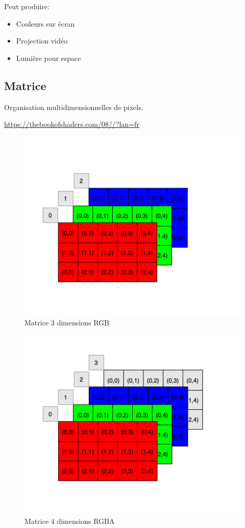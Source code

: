 \documentclass[
  french,
]{book}
\providecommand{\tightlist}{%
  \setlength{\itemsep}{0pt}\setlength{\parskip}{0pt}}
\begin{document}
Peut produire:

\begin{itemize}
\tightlist
\item
  Couleurs sur écran
\item
  Projection vidéo
\item
  Lumière pour espace
\end{itemize}

\hypertarget{matrice}{%
\subsection{Matrice}\label{matrice}}

Organisation multidimensionnelles de pixels.

\url{https://thebookofshaders.com/08//?lan=fr}

\begin{figure}
\centering
\includegraphics{medias/traiter/figures/dia_matrice_RGB.png}
\caption{Matrice 3 dimensions RGB}
\end{figure}

\begin{figure}
\centering
\includegraphics{medias/traiter/figures/dia_matrice_RGBA.png}
\caption{Matrice 4 dimensions RGBA}
\end{figure}
\end{document}
